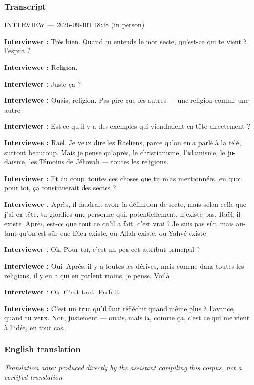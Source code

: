 \subsubsection*{Transcript}
\begin{otherlanguage}{french}
INTERVIEW — 2026-09-10T18:38 (in person)

\textbf{Interviewer :} Très bien. Quand tu entends le mot secte, qu'est-ce qui te vient à l'esprit ?

\textbf{Interviewee :} Religion.

\textbf{Interviewer :} Juste ça ?

\textbf{Interviewee :} Ouais, religion. Pas pire que les autres — une religion comme une autre.

\textbf{Interviewer :} Est-ce qu'il y a des exemples qui viendraient en tête directement ?

\textbf{Interviewee :} Raël. Je veux dire les Raëliens, parce qu'on en a parlé à la télé, surtout beaucoup. Mais je pense qu'après, le christianisme, l'islamisme, le judaïsme, les Témoins de Jéhovah — toutes les religions.

\textbf{Interviewer :} Et du coup, toutes ces choses que tu m'as mentionnées, en quoi, pour toi, ça constituerait des sectes ?

\textbf{Interviewee :} Après, il faudrait avoir la définition de secte, mais selon celle que j'ai en tête, tu glorifies une personne qui, potentiellement, n'existe pas. Raël, il existe. Après, est-ce que tout ce qu'il a fait, c'est vrai ? Je suis pas sûr, mais autant qu'on est sûr que Dieu existe, ou Allah existe, ou Yahvé existe.

\textbf{Interviewer :} Ok. Pour toi, c'est un peu cet attribut principal ?

\textbf{Interviewee :} Oui. Après, il y a toutes les dérives, mais comme dans toutes les religions, il y en a qui en parlent moins, je pense. Voilà.

\textbf{Interviewer :} Ok. C'est tout. Parfait.

\textbf{Interviewee :} C'est un truc qu'il faut réfléchir quand même plus à l'avance, quand tu veux. Non, justement — ouais, mais là, comme ça, c'est ce qui me vient à l'idée, en tout cas.
\end{otherlanguage}
\subsubsection*{English translation}
\textit{Translation note: produced directly by the assistant compiling this corpus, not a certified translation.}

